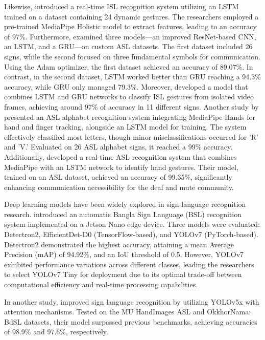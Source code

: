 \documentclass[preprint,12pt,authoryear]{elsarticle}
\begin{document}
Likewise, \cite{Shamitha} introduced a real-time ISL recognition system utilizing an LSTM trained on a dataset containing 24 dynamic gestures. The researchers employed a pre-trained MediaPipe Holistic model to extract features, leading to an accuracy of 97\%.
Furthermore, \cite{Paul24} examined three models—an improved ResNet-based CNN, an LSTM, and a GRU—on custom ASL datasets. The first dataset included 26 signs, while the second focused on three fundamental symbols for communication. Using the Adam optimizer, the first dataset achieved an accuracy of 89.07\%. In contrast, in the second dataset, LSTM worked better than GRU reaching a 94.3\% accuracy, while GRU only managed 79.3\%.
Moreover, \cite{Kothadiya22} developed a model that combines LSTM and GRU networks to classify ISL gestures from isolated video frames, achieving around 97\%  of accuracy in 11 different signs.
Another study by \cite{Sundar} presented an ASL alphabet recognition system integrating MediaPipe Hands for hand and finger tracking, alongside an LSTM model for training. The system effectively classified most letters, though minor misclassifications occurred for 'R' and 'V.' Evaluated on 26 ASL alphabet signs, it reached a 99\% accuracy.
Additionally, \cite{Abdulhamied} developed a real-time ASL recognition system that combines MediaPipe with an LSTM network to identify hand gestures. Their model, trained on an ASL dataset, achieved an accuracy of 99.35\%, significantly enhancing communication accessibility for the deaf and mute community.

Deep learning models have been widely explored in sign language recognition research. \cite{Siddique23} introduced an automatic Bangla Sign Language (BSL) recognition system implemented on a Jetson Nano edge device. Three models were evaluated: Detectron2, EfficientDet-D0 (TensorFlow-based), and YOLOv7 (PyTorch-based). Detectron2 demonstrated the highest accuracy, attaining a mean Average Precision (mAP) of 94.92\%, and an IoU threshold of 0.5. However, YOLOv7 exhibited performance variations across different classes, leading the researchers to select YOLOv7 Tiny for deployment due to its optimal trade-off between computational efficiency and real-time processing capabilities.

In another study, \cite{Attia} improved sign language recognition by utilizing YOLOv5x with attention mechanisms. Tested on the MU HandImages ASL and OkkhorNama: BdSL datasets, their model surpassed previous benchmarks, achieving accuracies of 98.9\% and 97.6\%, respectively.
\end{document}
